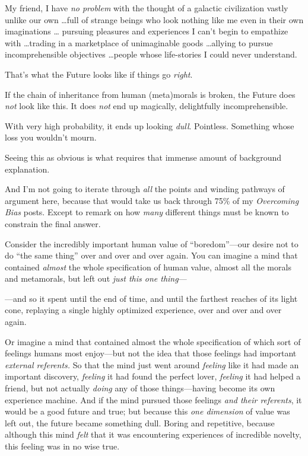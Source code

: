 {
 My friend, I have \textit{no problem} with the thought of a
galactic civilization vastly unlike our own \ldots full of strange
beings who look nothing like me even in their own imaginations \ldots
pursuing pleasures and experiences I can't begin to
empathize with \ldots trading in a marketplace of unimaginable goods
\ldots allying to pursue incomprehensible objectives \ldots people whose
life-stories I could never understand.}

{
 That's what the Future looks like if things go
\textit{right}.}

{
 If the chain of inheritance from human (meta)morals is broken, the
Future does \textit{not} look like this. It does \textit{not} end up
magically, delightfully incomprehensible.}

{
 With very high probability, it ends up looking \textit{dull}.
Pointless. Something whose loss you wouldn't mourn.}

{
 Seeing this as obvious is what requires that immense amount of
background explanation.}

{
 And I'm not going to iterate through \textit{all}
the points and winding pathways of argument here, because that would
take us back through 75\% of my \textit{Overcoming Bias} posts. Except
to remark on how \textit{many} different things must be known to
constrain the final answer.}

{
 Consider the incredibly important human value of
``boredom''{}---our desire not to do
``the same thing'' over and over and
over again. You can imagine a mind that contained \textit{almost} the
whole specification of human value, almost all the morals and
metamorals, but left out \textit{just this one thing}{}---}

{
 {}---and so it spent until the end of time, and until the farthest
reaches of its light cone, replaying a single highly optimized
experience, over and over and over again.}

{
 Or imagine a mind that contained almost the whole specification of
which sort of feelings humans most enjoy---but not the idea that those
feelings had important \textit{external referents.} So that the mind
just went around \textit{feeling} like it had made an important
discovery, \textit{feeling} it had found the perfect lover,
\textit{feeling} it had helped a friend, but not actually
\textit{doing} any of those things---having become its own experience
machine. And if the mind pursued those feelings \textit{and their
referents}, it would be a good future and true; but because this
\textit{one dimension} of value was left out, the future became
something dull. Boring and repetitive, because although this mind
\textit{felt} that it was encountering experiences of incredible
novelty, this feeling was in no wise true.}

